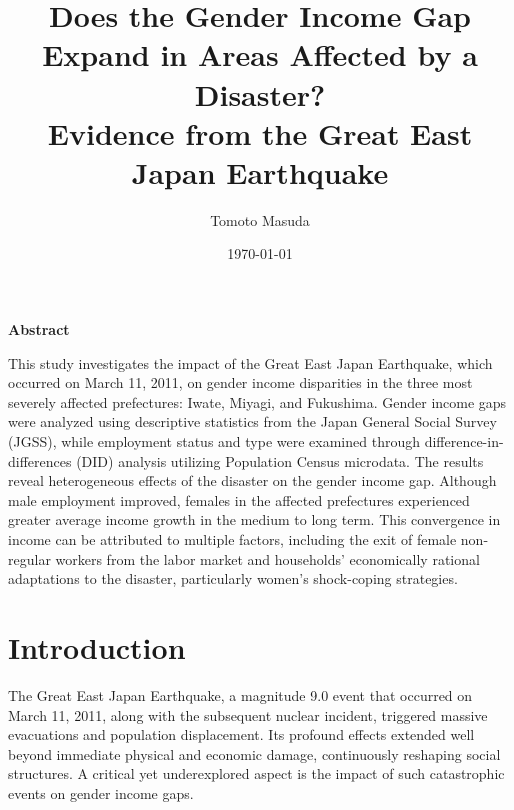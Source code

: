 \documentclass[a4paper,12pt]{article}
\begin{document}
\title{Does the Gender Income Gap Expand in Areas Affected by a Disaster? \\ Evidence from the Great East Japan Earthquake}

\author{Tomoto Masuda}


\date{\today}

\maketitle

\begin{center}
    \textbf{Abstract}
\end{center}

\noindent

This study investigates the impact of the Great East Japan Earthquake, which occurred on March 11, 2011, on gender income disparities in the three most severely affected prefectures: Iwate, Miyagi, and Fukushima. Gender income gaps were analyzed using descriptive statistics from the Japan General Social Survey (JGSS), while employment status and type were examined through difference-in-differences (DID) analysis utilizing Population Census microdata. The results reveal heterogeneous effects of the disaster on the gender income gap. Although male employment improved, females in the affected prefectures experienced greater average income growth in the medium to long term. This convergence in income can be attributed to multiple factors, including the exit of female non-regular workers from the labor market and households' economically rational adaptations to the disaster, particularly women's shock-coping strategies.

\newpage


\tableofcontents


\clearpage
\section{Introduction}

The Great East Japan Earthquake, a magnitude 9.0 event that occurred on March 11, 2011, along with the subsequent nuclear incident, triggered massive evacuations and population displacement. Its profound effects extended well beyond immediate physical and economic damage, continuously reshaping social structures. A critical yet underexplored aspect is the impact of such catastrophic events on gender income gaps.
\end{document}
